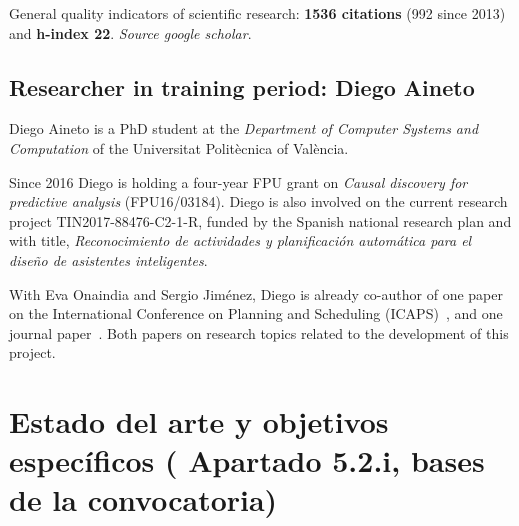 \documentclass[10pt,a4paper]{paper}
\begin{document}
General quality indicators of scientific research: {\bf 1536 citations} (992 since 2013) and {\bf h-index 22}. {\scriptsize\em Source google scholar}.


\subsection{Researcher in training period: Diego Aineto}
Diego Aineto is a PhD student at the {\em Department of Computer Systems and Computation} of the Universitat Politècnica of València.

Since 2016 Diego is holding a four-year FPU grant on {\em Causal discovery for predictive analysis} (FPU16/03184). Diego is also involved on the current research project TIN2017-88476-C2-1-R, funded by the Spanish national research plan and with title, {\em Reconocimiento de actividades y planificación automática para el diseño de asistentes inteligentes}.

With Eva Onaindia and Sergio Jiménez, Diego is already co-author of one paper on the International Conference on Planning and Scheduling (ICAPS)~\cite{diego-icaps18}, and one journal paper~\cite{onaindia2018common}. Both papers on research topics related to the development of this project. 


\newpage
\section{Estado del arte y objetivos específicos ( Apartado 5.2.i, bases de la convocatoria)}
\end{document}
